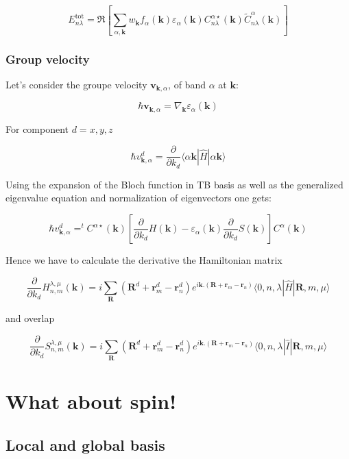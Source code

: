 \documentclass{article}
\newcommand{\bra}[1]{\langle #1|}
\newcommand{\ket}[1]{|#1\rangle}
\newcommand{\op}[1]{\hat{#1}}
\begin{document}
\[ E_{n \lambda}^{\text{tot}}=\Re \left[ 
\sum_{\alpha,\mathbf{k}} w_{\mathbf{k}} f_{\alpha}(\mathbf{k})\varepsilon_{\alpha}(\mathbf{k})
C_{n \lambda}^{\alpha \star}(\mathbf{k}) \widetilde{C}_{n \lambda}^{\alpha}(\mathbf{k}) \right]
 \]

\subsubsection{Group velocity }

Let's consider the groupe velocity $\mathbf{v}_{\mathbf{k},\alpha}$, of band $\alpha$ at $\mathbf{k}$:

\[ \hbar \mathbf{v}_{\mathbf{k},\alpha}=\nabla_{\mathbf{k}} \varepsilon_{\alpha}(\mathbf{k})\]

\noindent
For component $d=x,y,z$

\[ \hbar v_{\mathbf{k},\alpha}^{d}=\frac{\partial}{\partial k_{d}} \bra{\alpha \mathbf{k}} \op{H} \ket{\alpha \mathbf{k}}\]

\noindent
Using the expansion of the Bloch function in TB basis as well as the generalized eigenvalue equation and normalization of eigenvectors one gets:

\[ \hbar v_{\mathbf{k},\alpha}^{d}= ^tC^{\alpha \star}(\mathbf{k}) \left [\frac{\partial}{\partial k_{d}} H(\mathbf{k})  -\varepsilon_{\alpha}(\mathbf{k}) \frac{\partial}{\partial k_{d}} S(\mathbf{k}) \right] C^{\alpha}(\mathbf{k})\]

 \noindent
 Hence we have to calculate the derivative the Hamiltonian matrix
 
\[\displaystyle \frac{\partial}{\partial k_{d}}H_{n,m}^{\lambda,\mu}(\mathbf{k})=
i \sum_{\mathbf{R}} (\mathbf{R}^{d}+\mathbf{r}_{m}^{d}-\mathbf{r}_n^{d})e^{i\mathbf{k}.(\mathbf{R}+\mathbf{r}_{m}-\mathbf{r}_n)} \bra{ 0,n,\lambda} \op{H} \ket{\mathbf{R},m,\mu}\]

\noindent and overlap

\[\displaystyle  \frac{\partial}{\partial k_{d}} S_{n,m}^{\lambda,\mu}(\mathbf{k})=
i\sum_{\mathbf{R}} (\mathbf{R}^{d}+\mathbf{r}_{m}^{d}-\mathbf{r}_n^{d})e^{i\mathbf{k}.(\mathbf{R}+\mathbf{r}_{m}-\mathbf{r}_n)}
\bra{ 0,n,\lambda}\op{I}\ket{\mathbf{R},m,\mu }\]


\section{What about spin!}

\subsection{Local and global basis}
\end{document}
